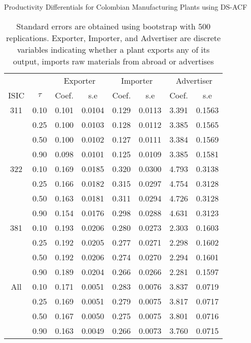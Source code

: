\documentclass[11pt]{article}
\begin{document}
\begin{table}[H]
\centering
\caption{Productivity Differentials for Colombian Manufacturing Plants using DS-ACF}
\begin{tabular}{cccccccc}
  \hline\hline & & \multicolumn{2}{c}{Exporter}  & \multicolumn{2}{c}{Importer} & \multicolumn{2}{c}{Advertiser} \\ \cmidrule(lr){3-4} \cmidrule(lr){5-6} \cmidrule(lr){7-8}ISIC & $\tau$ & Coef. & s.e & Coef. & s.e & Coef. & s.e \\ 
  \hline
311 & 0.10 & 0.101 & 0.0104 & 0.129 & 0.0113 & 3.391 & 0.1563 \\ 
   & 0.25 & 0.100 & 0.0103 & 0.128 & 0.0112 & 3.385 & 0.1565 \\ 
   & 0.50 & 0.100 & 0.0102 & 0.127 & 0.0111 & 3.384 & 0.1569 \\ 
   & 0.90 & 0.098 & 0.0101 & 0.125 & 0.0109 & 3.385 & 0.1581 \\ 
  322 & 0.10 & 0.169 & 0.0185 & 0.320 & 0.0300 & 4.793 & 0.3138 \\ 
   & 0.25 & 0.166 & 0.0182 & 0.315 & 0.0297 & 4.754 & 0.3128 \\ 
   & 0.50 & 0.163 & 0.0181 & 0.311 & 0.0294 & 4.726 & 0.3128 \\ 
   & 0.90 & 0.154 & 0.0176 & 0.298 & 0.0288 & 4.631 & 0.3123 \\ 
  381 & 0.10 & 0.193 & 0.0206 & 0.280 & 0.0273 & 2.303 & 0.1603 \\ 
   & 0.25 & 0.192 & 0.0205 & 0.277 & 0.0271 & 2.298 & 0.1602 \\ 
   & 0.50 & 0.192 & 0.0206 & 0.274 & 0.0270 & 2.294 & 0.1601 \\ 
   & 0.90 & 0.189 & 0.0204 & 0.266 & 0.0266 & 2.281 & 0.1597 \\ 
  All & 0.10 & 0.171 & 0.0051 & 0.283 & 0.0076 & 3.837 & 0.0719 \\ 
   & 0.25 & 0.169 & 0.0051 & 0.279 & 0.0075 & 3.817 & 0.0717 \\ 
   & 0.50 & 0.167 & 0.0050 & 0.275 & 0.0075 & 3.801 & 0.0716 \\ 
   & 0.90 & 0.163 & 0.0049 & 0.266 & 0.0073 & 3.760 & 0.0715 \\ 
   \hline
\end{tabular}
\caption*{Standard errors are obtained using bootstrap with 500 replications. Exporter, Importer, and Advertiser are discrete variables indicating whether a plant exports any of its output, imports raw materials from abroad or advertises}
\end{table}
\end{document}
